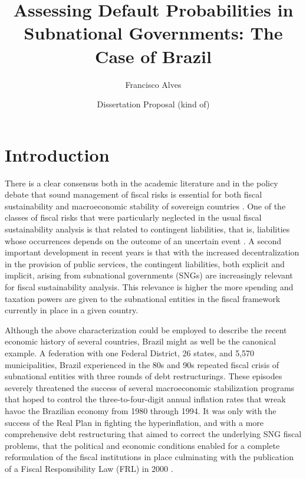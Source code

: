 \documentclass[12pt]{article}
\author{Francisco Alves}
\title{Assessing Default Probabilities in Subnational Governments: The Case of Brazil}
\date{Dissertation Proposal (kind of)}
\begin{document}
\maketitle


\section{Introduction}

There is a clear consensus both in the academic literature and in the policy debate that sound management of fiscal risks is essential for both fiscal sustainability and macroeconomic stability of sovereign countries \citep{brixi2002, kopits2014, imf2016}. One of the classes of fiscal risks that were particularly neglected in the usual fiscal sustainability analysis is that related to contingent liabilities, that is, liabilities whose occurrences depends on the outcome of an uncertain event \citep{brixi2002}. A second important development in recent years is that with the increased decentralization in the provision of public services, the contingent liabilities, both explicit and implicit, arising from subnational governments (SNGs) are increasingly relevant for fiscal sustainability analysis. This relevance is higher the more spending and taxation powers are given to the subnational entities in the fiscal framework currently in place in a given country.

Although the above characterization could be employed to describe the recent economic history of several countries, Brazil might as well be the canonical example. A federation with one Federal District, 26 states, and 5,570 municipalities, Brazil experienced in the 80s and 90s repeated fiscal crisis of subnational entities with three rounds of debt restructurings. These episodes severely threatened the success of several macroeconomic stabilization programs that hoped to control the three-to-four-digit annual inflation rates that wreak havoc the Brazilian economy from 1980 through 1994. It was only with the success of the Real Plan in fighting the hyperinflation, and with a more comprehensive debt restructuring that aimed to correct the underlying SNG fiscal problems, that the political and economic conditions enabled for a complete reformulation of the fiscal institutions in place culminating with the publication of a Fiscal Responsibility Law (FRL) in 2000 \citep[p. 34-35]{manoel2013}. 
\end{document}
